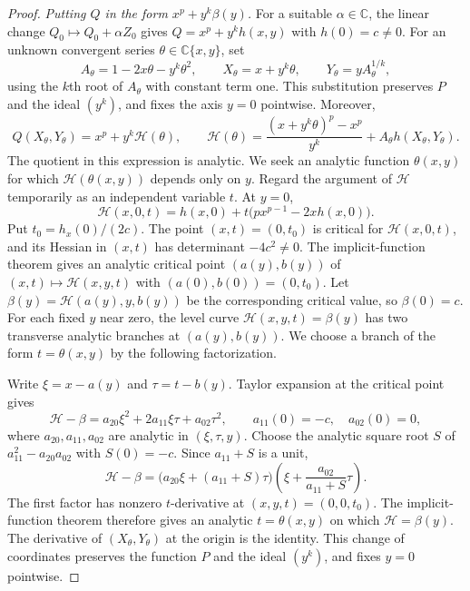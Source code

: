 \documentclass[11pt,letterpaper]{article}
\numberwithin{equation}{section}
\theoremstyle{remark}
\theoremstyle{plain}
\newcommand{\C}{\mathbb{C}}
\begin{document}
\begin{proof}
\noindent\emph{Putting $Q$ in the form $x^p+y^k\beta(y)$.}
For a suitable $\alpha\in\C$, the linear change $Q_0\mapsto Q_0+\alpha Z_0$
gives $Q=x^p+y^kh(x,y)$ with $h(0)=c\neq0$.  For an unknown convergent
series $\theta\in\C\{x,y\}$, set
\[
 A_\theta=1-2x\theta-y^k\theta^2,\qquad
 X_\theta=x+y^k\theta,\qquad Y_\theta=yA_\theta^{1/k},
\]
using the $k$th root of $A_\theta$ with constant term one.  This
substitution preserves $P$ and the ideal $(y^k)$, and fixes the axis
$y=0$ pointwise.  Moreover,
\[
 Q(X_\theta,Y_\theta)=x^p+y^k\mathcal H(\theta),\qquad
 \mathcal H(\theta)=
 \frac{(x+y^k\theta)^p-x^p}{y^k}
 +A_\theta h(X_\theta,Y_\theta).
\]
The quotient in this expression is analytic.  We seek an analytic
function $\theta(x,y)$ for which $\mathcal H(\theta(x,y))$ depends only on $y$.
Regard the argument of $\mathcal H$ temporarily as an independent
variable $t$.  At $y=0$,
\[
 \mathcal H(x,0,t)
 =h(x,0)+t\bigl(px^{p-1}-2xh(x,0)\bigr).
\]
Put $t_0=h_x(0)/(2c)$.  The point $(x,t)=(0,t_0)$ is critical
for $\mathcal H(x,0,t)$, and its Hessian in $(x,t)$ has determinant
$-4c^2\neq0$.  The implicit-function theorem gives an analytic
critical point $(a(y),b(y))$ of $(x,t)\mapsto\mathcal H(x,y,t)$
with $(a(0),b(0))=(0,t_0)$.
Let $\beta(y)=\mathcal H(a(y),y,b(y))$ be the corresponding
critical value, so $\beta(0)=c$.
For each fixed $y$ near zero, the level curve
$\mathcal H(x,y,t)=\beta(y)$ has two transverse analytic branches
at $(a(y),b(y))$.
We choose a branch of the form $t=\theta(x,y)$ by the following
factorization.

Write $\xi=x-a(y)$ and $\tau=t-b(y)$.  Taylor expansion at the
critical point gives
\[
 \mathcal H-\beta=a_{20}\xi^2+2a_{11}\xi\tau+a_{02}\tau^2,
 \qquad a_{11}(0)=-c,\quad a_{02}(0)=0,
\]
where $a_{20},a_{11},a_{02}$ are analytic in $(\xi,\tau,y)$.
Choose the analytic square root $S$ of $a_{11}^2-a_{20}a_{02}$
with $S(0)=-c$.  Since $a_{11}+S$ is a unit,
\[
 \mathcal H-\beta=
 \bigl(a_{20}\xi+(a_{11}+S)\tau\bigr)
 \left(\xi+\frac{a_{02}}{a_{11}+S}\tau\right).
\]
The first factor has nonzero $t$-derivative at $(x,y,t)=(0,0,t_0)$.
The implicit-function theorem therefore gives an analytic
$t=\theta(x,y)$ on which $\mathcal H=\beta(y)$.
The derivative of $(X_\theta,Y_\theta)$ at the origin is the identity.
This change of coordinates preserves the function $P$ and the ideal
$(y^k)$, and fixes $y=0$ pointwise.


\end{proof}
\end{document}
